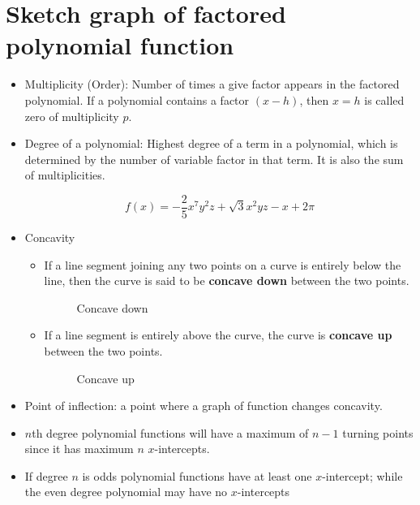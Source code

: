 \chapter{Sketch graph of factored polynomial function}
\begin{itemize}
    \item Multiplicity (Order): Number of times a give factor appears in the factored polynomial. If a polynomial contains a factor $(x-h)$, then $x=h$ is called zero of multiplicity $p$.
    \item Degree of a polynomial: Highest degree of a term in a polynomial, which is determined by the number of variable factor in that term. It is also the sum of multiplicities.
        \begin{eg}
            \[
                f(x)=-\frac{2}{5}x^7 y^2 z+\sqrt{3}x^2 yz-x+2\pi
            \]
        \end{eg}
    \item Concavity
        \begin{itemize}
                \item If a line segment joining any two points on a curve is entirely below the line, then the curve is said to be \textbf{concave down} between the two points.
                    \begin{figure}[H]
                        \centering
                        \caption{Concave down}
                    \end{figure}
                \item If a line segment is entirely above the curve, the curve is \textbf{concave up} between the two points.
                    \begin{figure}[H]
                        \centering
                        \caption{Concave up}
                    \end{figure}
        \end{itemize}
    \item Point of inflection: a point where a graph of function changes concavity.
    \item $n$th degree polynomial functions will have a maximum of $n-1$ turning points since it has maximum $n$ $x$-intercepts.
    \item If degree $n$ is odds polynomial functions have at least one $x$-intercept; while the even degree polynomial may have no $x$-intercepts
\end{itemize}

